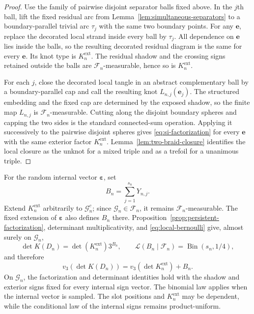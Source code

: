 \documentclass[9pt,twoside]{pnas-new}
\theoremstyle{definition}
\theoremstyle{remark}
\begin{document}
\begin{proof}
Use the family of pairwise disjoint separator balls fixed above.  In the $j$th ball, lift the fixed residual arc from Lemma~\ref{lem:simultaneous-separators} to a boundary-parallel trivial arc $\tau_j$ with the same two boundary points.  For any $\mathbf e$, replace the decorated local strand inside every ball by $\tau_j$.  All dependence on $\mathbf e$ lies inside the balls, so the resulting decorated residual diagram is the same for every $\mathbf e$.  Its knot type is $K_n^{\mathrm{ext}}$.  The residual shadow and the crossing signs retained outside the balls are $\mathcal F_n$-measurable, hence so is $K_n^{\mathrm{ext}}$.

For each $j$, close the decorated local tangle in an abstract complementary ball by a boundary-parallel cap and call the resulting knot $L_{n,j}(\mathbf e_j)$.  The structured embedding and the fixed cap are determined by the exposed shadow, so the finite map $L_{n,j}$ is $\mathcal F_n$-measurable.  Cutting along the disjoint boundary spheres and capping the two sides is the standard connected-sum operation.  Applying it successively to the pairwise disjoint spheres gives \eqref{eq:si-factorization} for every $\mathbf e$ with the same exterior factor $K_n^{\mathrm{ext}}$.  Lemma~\ref{lem:two-braid-closure} identifies the local closure as the unknot for a mixed triple and as a trefoil for a unanimous triple.
\end{proof}

For the random internal vector $\boldsymbol\varepsilon$, set
\[
 B_n=\sum_{j=1}^{s_n}Y_{n,j}.
\]
Extend $K_n^{\mathrm{ext}}$ arbitrarily to $\mathcal G_n^c$; since $\mathcal G_n\in\mathcal F_n$, it remains $\mathcal F_n$-measurable. The fixed extension of $\boldsymbol\varepsilon$ also defines $B_n$ there. Proposition~\ref{prop:persistent-factorization}, determinant multiplicativity, and \eqref{eq:local-bernoulli} give, almost surely on $\mathcal G_n$,
\begin{equation}
 \det K(D_n)=\det(K_n^{\mathrm{ext}})3^{B_n},
 \qquad
 \mathcal L(B_n\mid\mathcal F_n)=\operatorname{Bin}(s_n,1/4),
 \label{eq:si-hidden-coordinate-product}
\end{equation}
and therefore
\begin{equation}
 v_3\!\left(\det K(D_n)\right)=v_3(\det K_n^{\mathrm{ext}})+B_n.
 \label{eq:si-hidden-coordinate}
\end{equation}
On $\mathcal G_n$, the factorization and determinant identities hold with the shadow and exterior signs fixed for every internal sign vector. The binomial law applies when the internal vector is sampled. The slot positions and $K_n^{\mathrm{ext}}$ may be dependent, while the conditional law of the internal signs remains product-uniform.
\end{document}
